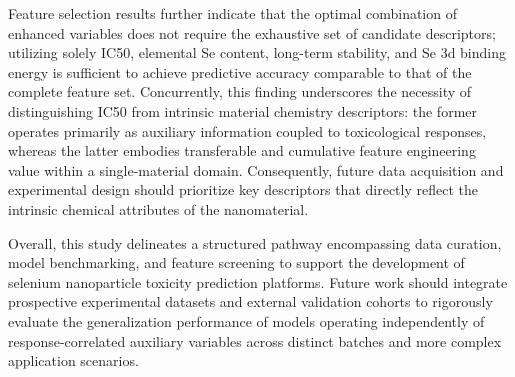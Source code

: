 Feature selection results further indicate that the optimal combination of enhanced variables does not require the exhaustive set of candidate descriptors; utilizing solely IC50, elemental Se content, long-term stability, and Se 3d binding energy is sufficient to achieve predictive accuracy comparable to that of the complete feature set. Concurrently, this finding underscores the necessity of distinguishing IC50 from intrinsic material chemistry descriptors: the former operates primarily as auxiliary information coupled to toxicological responses, whereas the latter embodies transferable and cumulative feature engineering value within a single-material domain. Consequently, future data acquisition and experimental design should prioritize key descriptors that directly reflect the intrinsic chemical attributes of the nanomaterial.

Overall, this study delineates a structured pathway encompassing data curation, model benchmarking, and feature screening to support the development of selenium nanoparticle toxicity prediction platforms. Future work should integrate prospective experimental datasets and external validation cohorts to rigorously evaluate the generalization performance of models operating independently of response-correlated auxiliary variables across distinct batches and more complex application scenarios.
